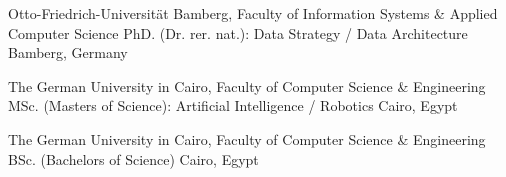 








\begin{cventries}



  \cventry
    {Otto-Friedrich-Universit\"{a}t Bamberg, Faculty of Information Systems \& Applied Computer Science}  %
    {PhD. (Dr. rer. nat.): Data Strategy / Data Architecture} %
    {}%
    {Bamberg, Germany} %
    {	
    }

    
\vspace{-2ex}


  \cventry
    {The German University in Cairo, Faculty of Computer Science \& Engineering}  %
    {MSc. (Masters of Science): Artificial Intelligence / Robotics} %
    {}%
    {Cairo, Egypt} %
    {	
    }
    
    
\vspace{-2ex}



  \cventry
    {The German University in Cairo, Faculty of Computer Science \& Engineering}  %
    {BSc. (Bachelors of Science)} %
    {}%
    {Cairo, Egypt} %
    {	
    }
    
    
\vspace{-3ex}
    		

\end{cventries}

